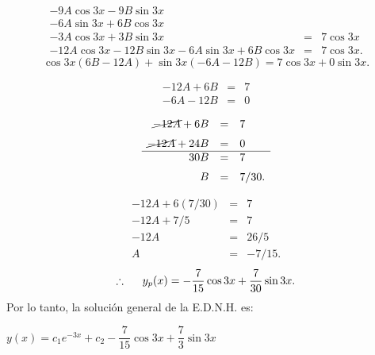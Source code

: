 \documentclass[9pt]{beamer}
\begin{document}
\begin{frame}[t]
	\begin{exampleblock}{}
		\[
			\begin{array}{rcl}
				-9A \cos 3x-9B \sin 3x && \\[2mm]
				-6A \sin 3x+6B \cos 3x&& \\[2mm]
				-3A \cos 3x + 3B \sin 3x & = & 7 \cos 3x \\[2mm]
				-12A \cos 3x-12B \sin 3x-6A \sin 3x+6B \cos 3x & = & 7 \cos 3x.
			\end{array}
		\]
		\[
			\cos 3x (6B-12A) + \sin 3x (-6A-12B) = 7 \cos 3x + 0 \sin 3x.
		\]
		\begin{minipage}{0.4\linewidth}
			\[
				\begin{array}{rcl}
					-12A + 6B & = & 7 \\[2mm]
					-6A -12B & = & 0
				\end{array}
			\]
		\end{minipage}
		\begin{minipage}{0.5\linewidth}
			\[
				\begin{array}{rcl}
					\cancel{-12A} + 6B & = & 7 \\[2mm]
					\cancel{-12A} + 24B & = & 0 \\ \hline
					30B & = & 7 \\[2mm]
					B & = & 7/30.
				\end{array}
			\]
		\end{minipage}
	\end{exampleblock}
\end{frame}

\begin{frame}[t]
	\begin{exampleblock}{}
		\[
			\begin{array}{rcl}
				-12A +6(7/30) & = & 7 \\[2mm]
				-12A + 7/5 & = & 7 \\[2mm]
				-12A & = & 26/5 \\[2mm]
				A & = & -7/15.
			\end{array}
		\]
		\[
			\therefore \hspace{5mm} y_p(x) = - \dfrac{7}{15} \cos 3x+ \dfrac{7}{30} \sin 3x.
		\]
		Por lo tanto, la solución general de la E.D.N.H. es:
		\begin{center}
			\color{red} \underline{\color{black} \(y(x) = c_1 e^{-3x} + c_2 - \dfrac{7}{15} \cos 3x+ \dfrac{7}{3} \sin 3x\)}
		\end{center}
	\end{exampleblock}
\end{frame}
\end{document}
